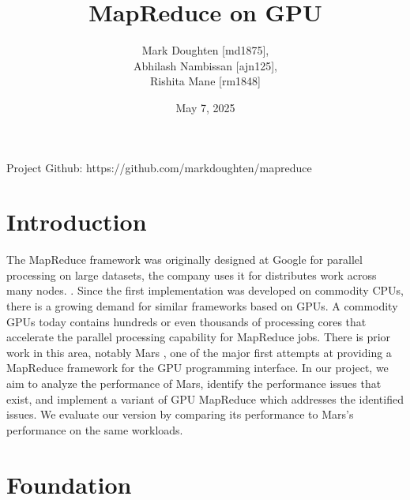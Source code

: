 \documentclass{article}
\title{MapReduce on GPU}
\author{Mark Doughten [md1875], \\ Abhilash Nambissan [ajn125], \\ Rishita Mane [rm1848]}
\date{May 7, 2025}
\begin{document}
\maketitle

Project Github: https://github.com/markdoughten/mapreduce

\section{Introduction}
The MapReduce framework was originally designed at Google for parallel processing on large datasets, the company uses it for distributes work across many nodes. \cite{mapreduce}. Since the first implementation was developed on commodity CPUs, there is a growing demand for similar frameworks based on GPUs. A commodity GPUs today contains hundreds or even thousands of processing cores that accelerate the parallel processing capability for MapReduce jobs. There is prior work in this area, notably Mars \cite{mars}, one of the major first attempts at providing a MapReduce framework for the GPU programming interface. In our project, we aim to analyze the performance of Mars, identify the performance issues that exist, and implement a variant of GPU MapReduce which addresses the identified issues. We evaluate our version by comparing its performance to Mars's performance on the same workloads. 

\section{Foundation}
\end{document}
